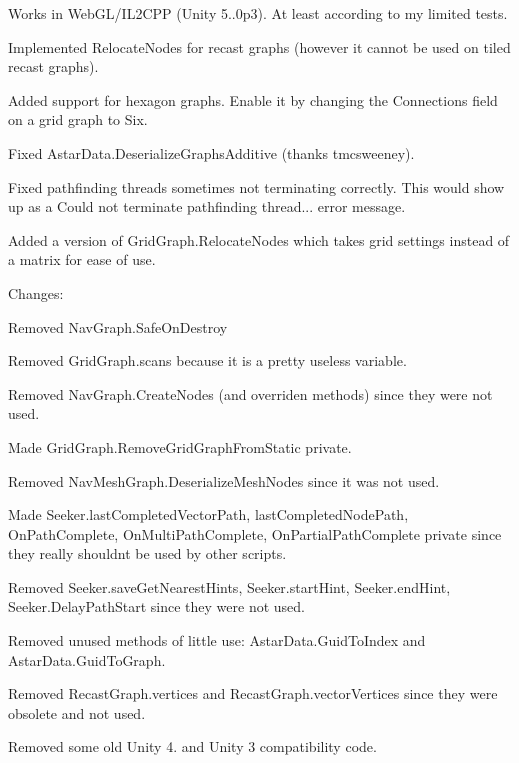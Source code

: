 \begin{DoxyItemize}
\begin{DoxyItemize}
\begin{DoxyItemize}
\item Works in Web\+G\+L/\+I\+L2\+C\+PP (Unity 5..\+0p3). At least according to my limited tests.
\item Implemented Relocate\+Nodes for recast graphs (however it cannot be used on tiled recast graphs).
\item Added support for hexagon graphs. Enable it by changing the \textquotesingle{}Connections\textquotesingle{} field on a grid graph to \textquotesingle{}Six\textquotesingle{}.
\item Fixed Astar\+Data.\+Deserialize\+Graphs\+Additive (thanks tmcsweeney).
\item Fixed pathfinding threads sometimes not terminating correctly. This would show up as a \textquotesingle{}Could not terminate pathfinding thread...\textquotesingle{} error message.
\item Added a version of Grid\+Graph.\+Relocate\+Nodes which takes grid settings instead of a matrix for ease of use.
\end{DoxyItemize}
\item Changes\+:
\begin{DoxyItemize}
\item Removed Nav\+Graph.\+Safe\+On\+Destroy
\item Removed Grid\+Graph.\+scans because it is a pretty useless variable.
\item Removed Nav\+Graph.\+Create\+Nodes (and overriden methods) since they were not used.
\item Made Grid\+Graph.\+Remove\+Grid\+Graph\+From\+Static private.
\item Removed Nav\+Mesh\+Graph.\+Deserialize\+Mesh\+Nodes since it was not used.
\item Made Seeker.\+last\+Completed\+Vector\+Path, last\+Completed\+Node\+Path, On\+Path\+Complete, On\+Multi\+Path\+Complete, On\+Partial\+Path\+Complete private since they really shouldn\textquotesingle{}t be used by other scripts.
\item Removed Seeker.\+save\+Get\+Nearest\+Hints, Seeker.\+start\+Hint, Seeker.\+end\+Hint, Seeker.\+Delay\+Path\+Start since they were not used.
\item Removed unused methods of little use\+: Astar\+Data.\+Guid\+To\+Index and Astar\+Data.\+Guid\+To\+Graph.
\item Removed Recast\+Graph.\+vertices and Recast\+Graph.\+vector\+Vertices since they were obsolete and not used.
\item Removed some old Unity 4. and Unity 3 compatibility code.

\end{DoxyItemize}
\end{DoxyItemize}
\end{DoxyItemize}
